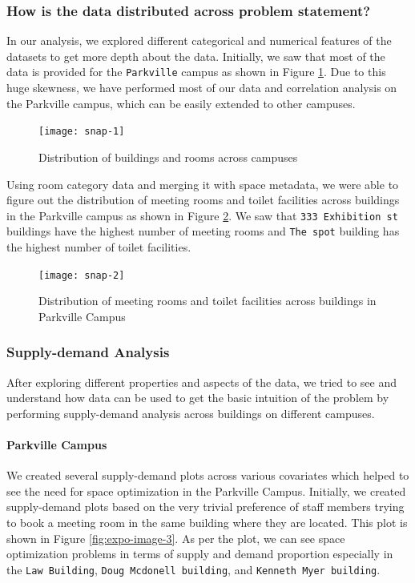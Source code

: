 \subsubsection{How is the data distributed across problem statement?}

In our analysis, we explored different categorical and numerical features of the datasets to get more depth about the data. Initially, we saw that most of the data is provided for the \texttt{Parkville} campus as shown in Figure \ref{fig:expo-image-1}. Due to this huge skewness, we have performed most of our data and correlation analysis on the Parkville campus, which can be easily extended to other campuses.

\begin{figure}[H]
\centering
\texttt{[image: snap-1]}
\caption{Distribution of buildings and rooms across campuses}
\label{fig:expo-image-1}
\end{figure}

Using room category data and merging it with space metadata, we were able to figure out the distribution of meeting rooms and toilet facilities across buildings in the Parkville campus as shown in Figure \ref{fig:expo-image-2}. We saw that \texttt{333 Exhibition st} buildings have the highest number of meeting rooms and \texttt{The spot} building has the highest number of toilet facilities.

\begin{figure}[H]
\centering
\texttt{[image: snap-2]}
\caption{Distribution of meeting rooms and toilet facilities across buildings in Parkville Campus}
\label{fig:expo-image-2}
\end{figure}

\subsubsection{Supply-demand Analysis}

After exploring different properties and aspects of the data, we tried to see and understand how data can be used to get the basic intuition of the problem by performing supply-demand analysis across buildings on different campuses.

\paragraph{Parkville Campus}

We created several supply-demand plots across various covariates which helped to see the need for space optimization in the Parkville Campus. Initially, we created supply-demand plots based on the very trivial preference of staff members trying to book a meeting room in the same building where they are located. This plot is shown in Figure \ref{fig:expo-image-3}. As per the plot, we can see space optimization problems in terms of supply and demand proportion especially in the \texttt{Law Building}, \texttt{Doug Mcdonell building}, and \texttt{Kenneth Myer building}.

